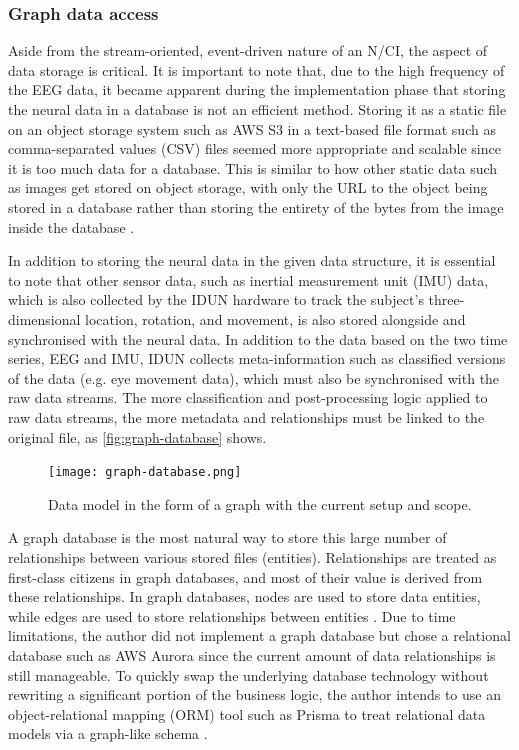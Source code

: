 \subsubsection{Graph data access}
\label{chapter5-graph-data-access}

Aside from the stream-oriented, event-driven nature of an N/CI, the aspect of data storage is critical. It is important to note that, due to the high frequency of the EEG data, it became apparent during the implementation phase that storing the neural data in a database is not an efficient method. Storing it as a static file on an object storage system such as AWS S3 in a text-based file format such as comma-separated values (CSV) files seemed more appropriate and scalable since it is too much data for a database. This is similar to how other static data such as images get stored on object storage, with only the URL to the object being stored in a database rather than storing the entirety of the bytes from the image inside the database \citep{datanamic_store_nodate}.

In addition to storing the neural data in the given data structure, it is essential to note that other sensor data, such as inertial measurement unit (IMU) data, which is also collected by the IDUN hardware to track the subject’s three-dimensional location, rotation, and movement, is also stored alongside and synchronised with the neural data. In addition to the data based on the two time series, EEG and IMU, IDUN collects meta-information such as classified versions of the data (e.g. eye movement data), which must also be synchronised with the raw data streams. The more classification and post-processing logic applied to raw data streams, the more metadata and relationships must be linked to the original file, as \autoref{fig:graph-database} shows.

\begin{figure}[!ht]
  \centering
  \texttt{[image: graph-database.png]}
  \caption{Data model in the form of a graph with the current setup and scope.}
  \label{fig:graph-database}
\end{figure}

A graph database is the most natural way to store this large number of relationships between various stored files (entities). Relationships are treated as first-class citizens in graph databases, and most of their value is derived from these relationships. In graph databases, nodes are used to store data entities, while edges are used to store relationships between entities \citep{amazon_web_services_inc_what_nodate}. Due to time limitations, the author did not implement a graph database but chose a relational database such as AWS Aurora since the current amount of data relationships is still manageable. To quickly swap the underlying database technology without rewriting a significant portion of the business logic, the author intends to use an object-relational mapping (ORM) tool such as Prisma to treat relational data models via a graph-like schema \citep{prisma_data_nodate}.

